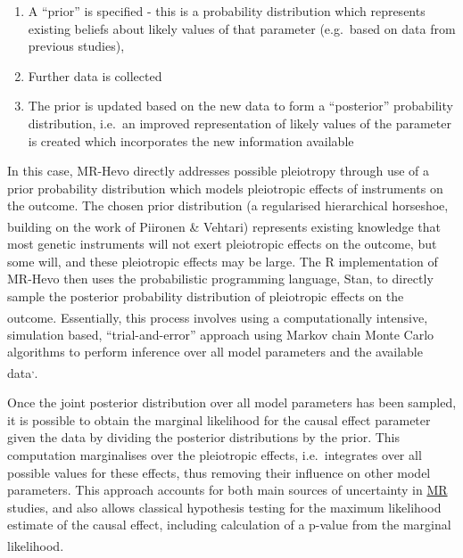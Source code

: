 \documentclass[
]{article}
\providecommand{\tightlist}{%
  \setlength{\itemsep}{0pt}\setlength{\parskip}{0pt}}
\begin{document}
\begin{enumerate}
\def\labelenumi{\arabic{enumi}.}
\tightlist
\item
  A ``prior'' is specified - this is a probability distribution which represents existing beliefs about likely values of that parameter (e.g.~based on data from previous studies),
\item
  Further data is collected
\item
  The prior is updated based on the new data to form a ``posterior'' probability distribution, i.e.~an improved representation of likely values of the parameter is created which incorporates the new information available
\end{enumerate}

In this case, MR-Hevo directly addresses possible pleiotropy through use of a prior probability distribution which models pleiotropic effects of instruments on the outcome. The chosen prior distribution (a regularised hierarchical horseshoe, building on the work of Piironen \& Vehtari\textsuperscript{}) represents existing knowledge that most genetic instruments will not exert pleiotropic effects on the outcome, but some will, and these pleiotropic effects may be large. The R implementation of MR-Hevo then uses the probabilistic programming language, Stan, to directly sample the posterior probability distribution of pleiotropic effects on the outcome\textsuperscript{}. Essentially, this process involves using a computationally intensive, simulation based, ``trial-and-error'' approach using Markov chain Monte Carlo algorithms to perform inference over all model parameters and the available data\textsuperscript{,}.

Once the joint posterior distribution over all model parameters has been sampled, it is possible to obtain the marginal likelihood for the causal effect parameter given the data by dividing the posterior distributions by the prior. This computation marginalises over the pleiotropic effects, i.e.~integrates over all possible values for these effects, thus removing their influence on other model parameters. This approach accounts for both main sources of uncertainty in \hyperref[acronyms_MR]{MR} studies, and also allows classical hypothesis testing for the maximum likelihood estimate of the causal effect, including calculation of a p-value from the marginal likelihood\textsuperscript{}.
\end{document}
